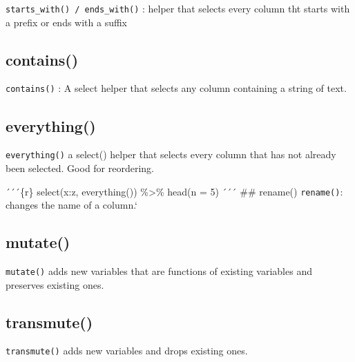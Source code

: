 \documentclass[
]{article}
\begin{document}
\texttt{starts\_with()\ /\ ends\_with()} : helper that selects every
column tht starts with a prefix or ends with a suffix

\hypertarget{contains}{%
\subsection{contains()}\label{contains}}

\texttt{contains()} : A select helper that selects any column containing
a string of text.

\hypertarget{everything}{%
\subsection{everything()}\label{everything}}

\texttt{everything()} a select() helper that selects every column that
has not already been selected. Good for reordering.

´´´\{r\} select(x:z, everything()) \%\textgreater\% head(n = 5) ´´´ \#\#
rename() \texttt{rename()}: changes the name of a column.`

\hypertarget{mutate}{%
\subsection{mutate()}\label{mutate}}

\texttt{mutate()} adds new variables that are functions of existing
variables and preserves existing ones.

\hypertarget{transmute}{%
\subsection{transmute()}\label{transmute}}

\texttt{transmute()} adds new variables and drops existing ones.
\end{document}
